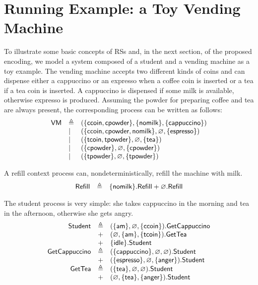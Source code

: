 
\section{Running Example: a Toy Vending Machine}\label{sec:student}

To illustrate some basic concepts of RSs and, in the next section, of the proposed \GROOVE encoding, we model a system composed of a student and a vending machine as a toy example.
The vending machine accepts two different kinds of coins and can dispense either a cappuccino or an expresso when a coffee coin is inserted or a tea if a tea coin is inserted. A cappuccino is dispensed if some milk is available, otherwise expresso is produced.
Assuming the powder for preparing coffee and tea are always present, the corresponding process can be written as follows:
\[
\begin{array}{lll}
\mathsf{VM} & \triangleq & (\{{\text{\sffamily ccoin}},{\text{\sffamily cpowder}}\},\{{\text{\sffamily nomilk}}\},\{{\text{\sffamily cappuccino}}\})\\
& | & (\{{\text{\sffamily ccoin}},{\text{\sffamily cpowder}},{\text{\sffamily nomilk}}\},\varnothing,\{{\text{\sffamily espresso}}\})\\
& | & (\{{\text{\sffamily tcoin}},{\text{\sffamily tpowder}}\},\varnothing,\{{\text{\sffamily tea}}\})\\
& | & (\{{\text{\sffamily cpowder}}\},\varnothing,\{{\text{\sffamily cpowder}}\})\\
& | & (\{{\text{\sffamily tpowder}}\},\varnothing,\{{\text{\sffamily tpowder}}\})\\
\end{array}
\]

A refill context process can, nondeterministically, refill the machine with milk.
\[
\begin{array}{lll}
\mathsf{Refill} & \triangleq & \{{\text{\sffamily nomilk}}\}.\mathsf{Refill}
+ \varnothing.\mathsf{Refill}
\end{array}
\]

The student process is very simple: she takes cappuccino in the morning and tea in the afternoon, otherwise she gets angry.
\[
\begin{array}{rll}
\mathsf{Student} & \triangleq & (\{{\text{\sffamily am}}\},\varnothing,\{{\text{\sffamily ccoin}}\}).\mathsf{GetCappuccino}\\
& + & (\varnothing,\{{\text{\sffamily am}}\},\{{\text{\sffamily tcoin}}\}).\mathsf{GetTea}\\
& + & \{{\text{\sffamily idle}}\}.\mathsf{Student}\\
\mathsf{GetCappuccino} & \triangleq & (\{{\text{\sffamily cappuccino}}\},\varnothing,\varnothing).\mathsf{Student}\\
& + & (\{{\text{\sffamily espresso}}\},\varnothing,\{{\text{\sffamily anger}}\}).\mathsf{Student}\\
\mathsf{GetTea} & \triangleq & (\{{\text{\sffamily tea}}\},\varnothing,\varnothing).\mathsf{Student}\\
& + & (\varnothing,\{{\text{\sffamily tea}}\},\{{\text{\sffamily anger}}\}).\mathsf{Student}\\
\end{array}
\]

